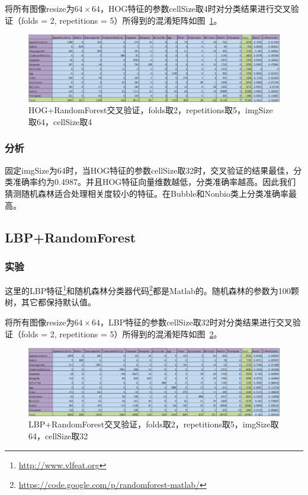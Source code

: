 \documentclass[12pt]{article}
\begin{document}
将所有图像resize为$64 \times 64$，HOG特征的参数cellSize取4时对分类结果进行交叉验证（folds = 2, repetitions = 5）所得到的混淆矩阵如图~\ref{fig: HOG-RF-2-folds-5-repetitions-4-64}。
\begin{figure}[!ht]
\centering
\includegraphics[width=1.0\linewidth]{HOG-RF-2-folds-5-repetitions-4-64}
\caption{HOG+RandomForest交叉验证，folds取2，repetitions取5，imgSize取64，cellSize取4}
\label{fig: HOG-RF-2-folds-5-repetitions-4-64}
\end{figure}

\subsubsection{分析}

固定imgSize为64时，当HOG特征的参数cellSize取32时，交叉验证的结果最佳，分类准确率约为0.4987。并且HOG特征向量维数越低，分类准确率越高。因此我们猜测随机森林适合处理相关度较小的特征。在Bubble和Nonbio类上分类准确率最高。

\subsection{LBP+RandomForest}

\subsubsection{实验}

这里的LBP特征\footnote{\url{http://www.vlfeat.org}}和随机森林分类器代码\footnote{\url{https://code.google.com/p/randomforest-matlab/}}都是Matlab的。随机森林的参数为100颗树，其它都保持默认值。

将所有图像resize为$64 \times 64$，LBP特征的参数cellSize取32时对分类结果进行交叉验证（folds = 2, repetitions = 5）所得到的混淆矩阵如图~\ref{fig: LBP-RF-2-folds-5-repetitions-32-64}。
\begin{figure}[!ht]
\centering
\includegraphics[width=1.0\linewidth]{LBP-RF-2-folds-5-repetitions-32-64}
\caption{LBP+RandomForest交叉验证，folds取2，repetitions取5，imgSize取64，cellSize取32}
\label{fig: LBP-RF-2-folds-5-repetitions-32-64}
\end{figure}
\end{document}
